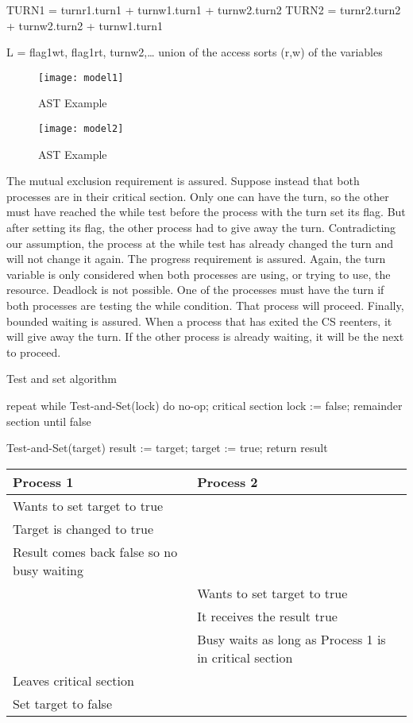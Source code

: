TURN1 = turnr1.turn1 + turnw1.turn1 + turnw2.turn2
TURN2 = turnr2.turn2 + turnw2.turn2 + turnw1.turn1

L = { flag1wt, flag1rt, turnw2,… union of the access sorts (r,w) of the
variables }

\begin{figure}[!t]
\centering
\texttt{[image: model1]}
\caption{AST Example}
\label{fig:ast_example}
\end{figure}

\begin{figure}[!t]
\centering
\texttt{[image: model2]}
\caption{AST Example}
\label{fig:ast_example}
\end{figure}

The mutual exclusion requirement is assured. Suppose instead that both processes are in their critical section. 
Only one can have the turn, so the other must have reached the while test before the process with the turn set its flag. 
But after setting its flag, the other process had to give away the turn. 
Contradicting our assumption, the process at the while test has already changed the turn and will not change it again.
	The progress requirement is assured. 
	Again, the turn variable is only considered when both processes are using, or trying to use, the resource.
	Deadlock is not possible. One of the processes must have the turn if both processes are testing the while condition. 
	That process will proceed.
	Finally, bounded waiting is assured. When a process that has exited the CS reenters, it will give away the turn. 
	If the other process is already waiting, it will be the next to proceed.

Test and set algorithm

repeat
while Test-and-Set(lock) do no-op;
critical section 
lock := false;
remainder section 
until false 

Test-and-Set(target) 
result := target;
target := true; 
return result 

\begin{tabular}{ | l | l | }
  \hline                       
  Process 1	& Process 2 \\ \hline 
  Wants to set target to true & \\
  Target is changed to true & \\
  Result comes back false so no busy waiting &\\
  & Wants to set target to true \\
  & It receives the result true \\
  & Busy waits as long as Process 1 is in critical section \\
  Leaves critical section & \\
  Set target to false & \\
  \hline  
\end{tabular}
